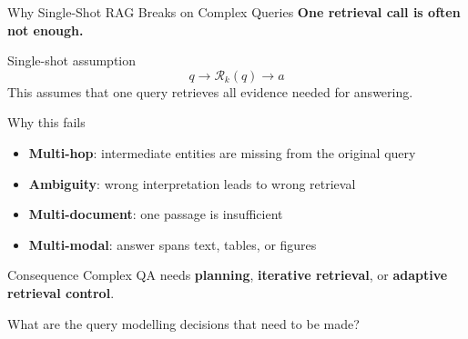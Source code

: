 \documentclass[aspectratio=169, xcolor=table]{beamer}
\newif\ifanimated
\newcommand{\cpause}{\ifanimated\pause\fi}
\begin{document}
\begin{frame}[shrink=10]{Why Single-Shot RAG Breaks on Complex Queries}
\textbf{One retrieval call is often not enough.}

\vspace{0.7em}
\begin{block}{Single-shot assumption}
\[
q \rightarrow \mathcal{R}_k(q) \rightarrow a
\]
This assumes that one query retrieves all evidence needed for answering.
\end{block}

\cpause
\begin{block}{Why this fails}
\begin{itemize}
  \item \textbf{Multi-hop}: intermediate entities are missing from the original query
  \item \textbf{Ambiguity}: wrong interpretation leads to wrong retrieval
  \item \textbf{Multi-document}: one passage is insufficient
  \item \textbf{Multi-modal}: answer spans text, tables, or figures
\end{itemize}
\end{block}

\cpause
\begin{block}{Consequence}
Complex QA needs \textbf{planning}, \textbf{iterative retrieval}, or \textbf{adaptive retrieval control}.
\end{block}
\end{frame}



\begin{frame}{What are the query modelling decisions that need to be made?}
\begin{center}
\resizebox{1.0\textwidth}{!}{

}
\end{center}
\end{frame}
\end{document}
